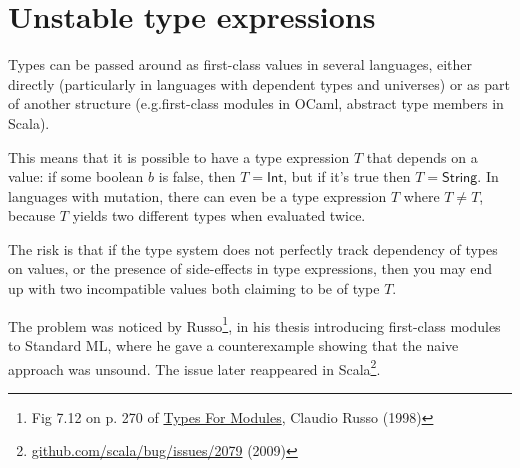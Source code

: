 \documentclass[11pt,oneside]{article}
\makeatletter
\newcommand{\tags}[1]{%
  \par\vspace{-0.55\baselineskip}%
  \noindent{\footnotesize\sffamily\color{lichen}#1}%
  \par\vspace{0.75\baselineskip}%
  \@afterindentfalse\@afterheading}
\makeatother
\begin{document}
\clearpage
\section{Unstable type expressions}\label{ce:unstable-types}
\tags{\hyperref[gloss:mutation]{Mutation}}
Types can be passed around as first-class values in several languages, either directly (particularly in languages with dependent types and universes) or as part of another structure (e.g.\@  first-class modules in OCaml, abstract type members in Scala).

This means that it is possible to have a type expression \(T\) that depends on a value: if some boolean \(b\) is false, then \(T = \mathsf{Int}\), but if it's true then \(T = \mathsf{String}\). In languages with mutation, there can even be a type expression \(T\) where \(T ≠ T\), because \(T\) yields two different types when evaluated twice.

The risk is that if the type system does not perfectly track dependency of types on values, or the presence of side-effects in type expressions, then you may end up with two incompatible values both claiming to be of type \(T\).

The problem was noticed by Russo\footnote{Fig 7.12 on p. 270 of \href{http://www.dcs.ed.ac.uk/home/cvr/ECS-LFCS-98-389.html}{Types For Modules}, Claudio Russo (1998)}, in his thesis introducing first-class modules to Standard ML, where he gave a counterexample showing that the naive approach was unsound. The issue later reappeared in Scala\footnote{\href{https://github.com/scala/bug/issues/2079}{github.com/\allowbreak{}scala/\allowbreak{}bug/\allowbreak{}issues/\allowbreak{}2079} (2009)}.
\end{document}
